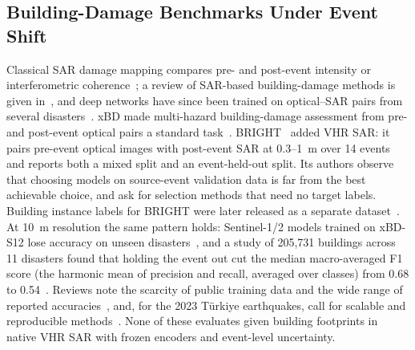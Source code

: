 \documentclass{ieeeaccess}
\begin{document}
\subsection{Building-Damage Benchmarks Under Event Shift}
Classical SAR damage mapping compares pre- and post-event intensity or interferometric coherence~\cite{matsuoka2004sar,plank2014rapid}; a review of SAR-based building-damage methods is given in~\cite{ge2020review}, and deep networks have since been trained on optical--SAR pairs from several disasters~\cite{adriano2021multimodal}. xBD made multi-hazard building-damage assessment from pre- and post-event optical pairs a standard task~\cite{gupta2019xbd}. BRIGHT~\cite{chen2025bright} added VHR SAR: it pairs pre-event optical images with post-event SAR at 0.3--1~m over 14 events and reports both a mixed split and an event-held-out split. Its authors observe that choosing models on source-event validation data is far from the best achievable choice, and ask for selection methods that need no target labels. Building instance labels for BRIGHT were later released as a separate dataset~\cite{chen2026brightzenodo}. At 10~m resolution the same pattern holds: Sentinel-1/2 models trained on xBD-S12 lose accuracy on unseen disasters~\cite{dietrich2026copernicus}, and a study of 205,731 buildings across 11 disasters found that holding the event out cut the median macro-averaged F1 score (the harmonic mean of precision and recall, averaged over classes) from 0.68 to 0.54~\cite{currie2026transfer}. Reviews note the scarcity of public training data and the wide range of reported accuracies~\cite{wang2024review}, and, for the 2023 T\"urkiye earthquakes, call for scalable and reproducible methods~\cite{taskin2026lessons,voelker2024eefit}. None of these evaluates given building footprints in native VHR SAR with frozen encoders and event-level uncertainty.
\end{document}
